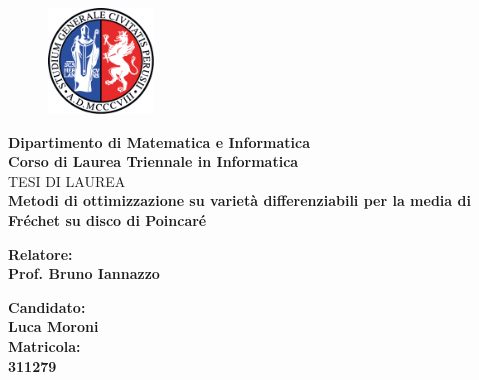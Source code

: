 \documentclass[a4paper, 12pt]{article}
\begin{document}
\begin{titlepage} %
\begin{figure}[t] %
    \centering\includegraphics[width=0.25\textwidth]{logo_unipg}
\end{figure}
\vspace{20mm}

\begin{Large}
 \begin{center}
	\textbf{Dipartimento di Matematica e Informatica\\ Corso di Laurea Triennale in Informatica\\}
	\vspace{20mm}
    {\LARGE{TESI DI LAUREA}}\\
	\vspace{10mm}
	{\huge{\bf Metodi di ottimizzazione su varietà differenziabili per la media di Fréchet su disco di Poincaré}}\\
\end{center}
\end{Large}


\vspace{30mm}
\begin{minipage}[t]{0.47\textwidth}
	{\large{\bf Relatore:\\ Prof. Bruno Iannazzo}}
\end{minipage}
\hfill
\begin{minipage}[t]{0.47\textwidth}\raggedleft
	{\large{\bf Candidato: \\ Luca Moroni\\ }}
	\vspace{5mm}
	{\large{\bf Matricola: \\ 311279\\ }}
\end{minipage}

\vspace{25mm}

\hrulefill

\vspace{5mm}


\end{titlepage}
\end{document}

